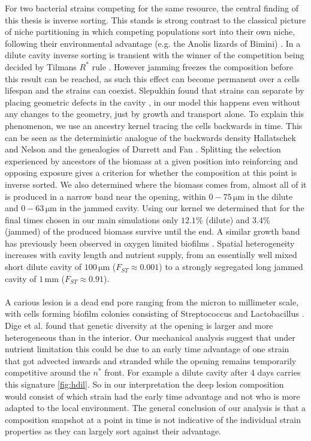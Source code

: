 \documentclass[11pt,a4paper]{report}
\begin{document}
	For two bacterial strains competing for the same resource, the central finding of this thesis is inverse sorting. This stands is strong contrast to the classical picture of niche partitioning in which competing populations sort into their own niche, following their environmental advantage (e.g. the Anolis lizards of Bimini) \cite{lizard}. In a dilute cavity inverse sorting is transient with the winner of the competition being decided by Tilmans $R^*$ rule \cite{rstar}. However jamming freezes the composition before this result can be reached, as such this effect can become permanent over a cells lifespan and the strains can coexist. Slepukhin found that strains can separate by placing geometric defects in the cavity \cite{slepukhin}, in our model this happens even without any changes to the geometry, just by growth and transport alone. To explain this phenomenon, we use an ancestry kernel tracing the cells backwards in time. This can be seen as the deterministic analogue of the backwards density Hallatschek and Nelson \cite{gene, lifeexp} and the genealogies of Durrett and Fan \cite{tracer}. Splitting the selection experienced by ancestors of the biomass at a given position into reinforcing and opposing exposure gives a criterion for whether the composition at this point is inverse sorted. We also determined where the biomass comes from, almost all of it is produced in a narrow band near the opening, within $0-75\,\mathrm{\mu m}$ in the dilute and $0-63\,\mathrm{\mu m}$ in the jammed cavity. Using our kernel we determined that for the final times chosen in our main simulations only $12.1\%$ (dilute) and $3.4\%$ (jammed) of the produced biomass survive until the end. A similar growth band has previously been observed in oxygen limited biofilms \cite{produ}. Spatial heterogeneity increases with cavity length and nutrient supply, from an essentially well mixed short dilute cavity of $100\,\mathrm{\mu m}$ ($F_{ST}\approx0.001$) to a strongly segregated long jammed cavity of $1\,\mathrm{mm}$ ($F_{ST}\approx0.91$). \\
	\\
	A carious lesion is a dead end pore ranging from the micron to millimeter scale, with cells forming biofilm colonies consisting of Streptococcus and Lactobacillus \cite{lesion}. Dige et al. found that genetic diversity at the opening is larger and more heterogeneous than in the interior. Our mechanical analysis suggest that under nutrient limitation this could be due to an early time advantage of one strain that got advected inwards and stranded while the opening remains temporarily competitive around the $n^*$ front. For example a dilute cavity after 4 days carries this signature \ref{fig:hdil}. So in our interpretation the deep lesion composition would consist of which strain had the early time advantage and not who is more adapted to the local environment. The general conclusion of our analysis is that a composition snapshot at a point in time is not indicative of the individual strain properties as they can largely sort against their advantage.\\
\end{document}
